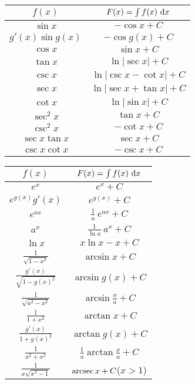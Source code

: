 \begin{center}
     \begin{tabular}{|c|c|}
        \hline
    $f(x)$ & $ F(x)=\int f(x)\ \mathrm{d}x$ \\ 
        \hline\hline
$\sin x$ & $-\cos x+C$ \\  \hline
$g'(x)\sin g(x)$ & $-\cos g(x)+C$ \\  \hline
$\cos x$ & $\sin x+C$ \\  \hline
$\tan x$ & $\ln|\sec x|+C$ \\  \hline
$\csc x$ & $\ln |\csc x-\cot x|+C$ \\  \hline
$\sec x$ & $\ln |\sec x+\tan x|+C$ \\  \hline
$\cot x$ & $\ln|\sin x|+C$ \\  \hline
$\sec^2 x$ & $\tan x+C$ \\  \hline
$\csc^2 x$ & $-\cot x+C$ \\  \hline
$\sec x\tan x$ & $\sec x+C$ \\  \hline
$\csc x\cot x$ & $-\csc x+C$ \\  \hline\hline
     \end{tabular}\qquad\qquad
     \begin{tabular}{|c|c|}
        \hline
    $f(x)$ & $ F(x)=\int f(x)\ \mathrm{d}x$ \\ 
        \hline\hline
$e^x$ & $e^x+C$ \\  \hline
$e^{g(x)}g'(x)$ & $e^{g(x)}+C$ \\  \hline
$e^{ax}$ & $\frac{1}{a}\ e^{ax}+C$ \\  \hline
$a^x$ & $\frac{1}{\ln a}\ a^x+C$ \\  \hline\hline
$\ln x$ & $x\ln x -x+C$ \\  \hline\hline
$\frac{1}{\sqrt{1-x^2}}$ & $\arcsin x+C$ \\  \hline
$\frac{g'(x)}{\sqrt{1-g(x)^2}}$ & $\arcsin g(x)+C$ \\  \hline
$\frac{1}{\sqrt{a^2-x^2}}$ & $\arcsin \frac{x}{a}+C$ \\  \hline
$\frac{1}{1+x^2}$ & $\arctan x+C$ \\  \hline
$\frac{g'(x)}{1+g(x)^2}$ & $\arctan g(x)+C$ \\  \hline
$\frac{1}{a^2+x^2}$ & $\frac{1}{a}\arctan \frac{x}{a}+C$ \\  \hline
$\frac{1}{x\sqrt{x^2-1}}$ & $\mathop{\mathrm{arcsec}} x+C$\quad($x>1$) \\  \hline
     \end{tabular}
\renewcommand{\arraystretch}{1.0}

\end{center}



